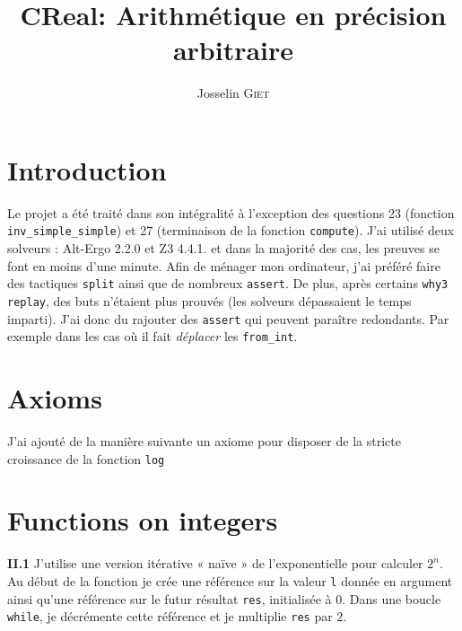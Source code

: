\documentclass[9pt,a4paper,twocolumn]{article}
\title{CReal: Arithmétique en précision arbitraire}   %
\author{Josselin \textsc{Giet}}  %
\theoremstyle{definition}
\newenvironment{code}[1][ocaml]{%
\newgeometry{textwidth = 0.8\textwidth}
\VerbatimEnvironment\begin{verbatim}%
}{%
\end{verbatim}
\restoregeometry
}
\begin{document}
\maketitle

\section*{Introduction}

Le projet a été traité dans son intégralité à l'exception des questions 23
(fonction \texttt{inv\_simple\_simple}) et 27 (terminaison de la fonction
\texttt{compute}).
J'ai utilisé deux solveurs : Alt-Ergo 2.2.0 et Z3 4.4.1. et dans la majorité des
cas, les preuves se font en moins d'une minute.
Afin de ménager mon ordinateur, j'ai préféré faire des tactiques \texttt{split}
ainsi que de nombreux \texttt{assert}.
De plus, après certains \texttt{why3 replay}, des buts n'étaient plus prouvés
(les solveurs dépassaient le temps imparti).
J'ai donc du rajouter des \texttt{assert} qui peuvent paraître redondants.
Par exemple dans les cas où il fait \textit{déplacer} les \texttt{from\_int}.





\tableofcontents
\listoflistings

\section{Axioms}


J'ai ajouté de la manière suivante un axiome pour disposer de la stricte
croissance de la fonction \texttt{log}

\section{Functions on integers}

\textbf{II.1}
J'utilise une version itérative « naïve » de l'exponentielle pour
calculer $2^n$. Au début de la fonction je crée une référence sur la valeur
\texttt{l} donnée en argument ainsi qu'une référence sur le futur résultat
\texttt{res}, initialisée à 0. Dans une boucle \texttt{while}, je décrémente
cette référence et je multiplie \texttt{res} par $2$.
\end{document}
